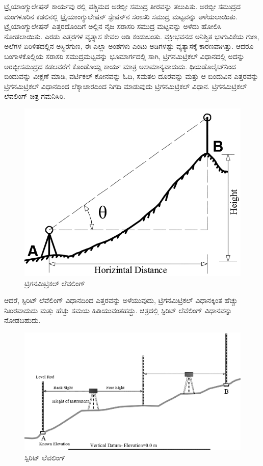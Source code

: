 ಟ್ರೈಯಾಂಗ್ಯುಲೇಷನ್​ ಕಾರ್ಯವು  ರಲ್ಲಿ ಪಶ್ಚಿಮದ ಅರಬ್ಬೀ ಸಮುದ್ರ ತೀರವನ್ನು ತಲುಪಿತು. ಅರಬ್ಬೀ ಸಮುದ್ರದ ಮಂಗಳೂರಿನ ಕಡಲಿನಲ್ಲಿ ಟ್ರೈಯಾಂಗ್ಯುಲೇಷನ್​ ಸ್ಟೇಷನ್​ನ ಸರಾಸರಿ ಸಮುದ್ರ ಮಟ್ಟವನ್ನು ಅಳೆಯಲಾಯಿತು. ಟ್ರೈಯಾಂಗ್ಯುಲೇಷನ್​ ಎತ್ತರದೊಂದಿಗೆ ಅಲ್ಲಿನ ನೈಜ ಸರಾಸರಿ ಸಮುದ್ರ ಮಟ್ಟವನ್ನು ಅಳೆದು ಹೋಲಿಸಿ ನೋಡಲಾಯಿತು. ಎರಡು ಎತ್ತರಗಳ ವ್ಯತ್ಯಾಸ ಕೇವಲ  ಅಡಿ ಕಂಡುಬಂತು. ವಕ್ರೀಭವನದ ಅನಿಶ್ಚಿತ ಭಾಗುವಿಕೆಯ ಗುಣ, ಅಲೆಗಳ ಏರಿಳಿತದಲ್ಲಿನ ಅಸ್ಥಿರಗುಣ, ಈ ಎಲ್ಲಾ ಅಂಶಗಳು ಎಂಟು ಅಡಿಗಳಷ್ಟು ವ್ಯತ್ಯಾಸಕ್ಕೆ ಕಾರಣವಾಗಿತ್ತು. ಆದರೂ ಬಂಗಾಳಕೊಲ್ಲಿಯ ಸರಾಸರಿ ಸಮುದ್ರಮಟ್ಟವನ್ನು ಭೂಮಾರ್ಗದಲ್ಲಿ ಸಾಗಿ, ಟ್ರಿಗನಮಿಟ್ರಿಕಲ್​ ವಿಧಾನದಲ್ಲಿ ಅದನ್ನು ಅರಬ್ಬೀಸಮುದ್ರದ ಕಡಲವರೆಗೆ ಕೊಂಡೊಯ್ದ ಕಾರ್ಯ ಮಾತ್ರ ಅಸಾಮಾನ್ಯವಾದುದು. ಥಿಯಡೊಲೈಟ್​ನಿಂದ ಬಿಂದುವನ್ನು ವೀಕ್ಷಣೆ ಮಾಡಿ, ವರ್ಟಿಕಲ್​ ಕೋನವನ್ನು ಓದಿ, ಸಮತಲ ದೂರವನ್ನು ಮತ್ತು ಆ ಬಿಂದುವಿನ ಎತ್ತರವನ್ನು ಟ್ರಿಗನಮಿಟ್ರಿಕಲ್​ ವಿಧಾನದಿಂದ ಲೆಕ್ಕಾಚಾರದಿಂದ ನಿಗದಿ ಮಾಡುವುದು ಟ್ರಿಗನಮಿಟ್ರಿಕಲ್​ ವಿಧಾನ. ಟ್ರಿಗನಮಿಟ್ರಿಕಲ್​ ಲೆವಲಿಂಗ್​ ಚಿತ್ರ ಗಮನಿಸಿರಿ.

\begin{figure}[!htbp]
\includegraphics[scale=0.75]{"images/image010.jpg"}
\caption{ಟ್ರಿಗನಮಿಟ್ರಿಕಲ್​ ಲೆವಲಿಂಗ್}\label{chap6-fig1}
\end{figure}

ಆದರೆ, ಸ್ಪಿರಿಟ್​ ಲೆವೆಲಿಂಗ್​ ವಿಧಾನದಿಂದ ಎತ್ತರವನ್ನು ಅಳೆಯುವುದು, ಟ್ರಿಗನಮಿಟ್ರಿಕಲ್​ ವಿಧಾನಕ್ಕಿಂತ ಹೆಚ್ಚು ನಿಖರವಾದುದು ಮತ್ತು ಹೆಚ್ಚು ಸಮಯ ಹಿಡಿಯುವಂತಹದ್ದು. ಚಿತ್ರದಲ್ಲಿ ಸ್ಪಿರಿಟ್​ ಲೆವೆಲಿಂಗ್​ ವಿಧಾನವನ್ನು ನೋಡಬಹುದು.

\begin{figure}[!htbp]
\includegraphics[scale=1.1]{"images/image011.jpg"}
\caption{ಸ್ಪಿರಿಟ್ ಲೆವಲಿಂಗ್}\label{chap6-fig2}
\end{figure}

